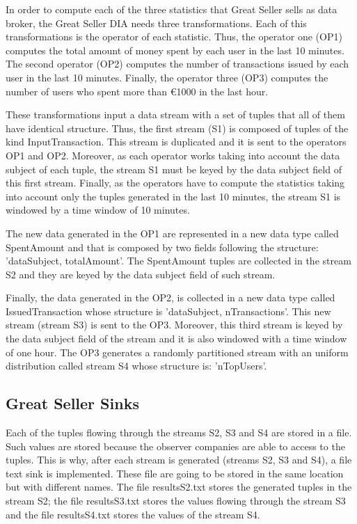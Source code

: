 In order to compute each of the three statistics that Great Seller sells as data broker, the Great Seller DIA needs three transformations. Each of this transformations is the operator of each statistic. Thus, the operator one (OP1) computes the total amount of money spent by each user in the last 10 minutes. The second operator (OP2) computes the number of transactions issued by each user in the last 10 minutes. Finally, the operator three (OP3) computes the number of users who spent more than \euro{1000} in the last hour.

These transformations input a data stream with a set of tuples that all of them have identical structure. Thus, the first stream (S1) is composed of tuples of the kind InputTransaction. This stream is duplicated and it is sent to the operators OP1 and OP2. Moreover, as each operator works taking into account the data subject of each tuple, the stream S1 must be keyed by the data subject field of this first stream. Finally, as the operators have to compute the statistics taking into account only the tuples generated in the last 10 minutes, the stream S1 is windowed by a time window of 10 minutes.

The new data generated in the OP1 are represented in a new data type called SpentAmount and that is composed by two fields following the structure: 'dataSubject, totalAmount'. The SpentAmount tuples are collected in the stream S2 and they are keyed by the data subject field of such stream.

Finally, the data generated in the OP2, is collected in a new data type called IssuedTransaction whose structure is 'dataSubject, nTransactions'. This new stream (stream S3) is sent to the OP3. Moreover, this third stream is keyed by the data subject field of the stream and it is also windowed with a time window of one hour. The OP3 generates a randomly partitioned stream with an uniform distribution called stream S4 whose structure is: 'nTopUsers'.

\subsection{Great Seller Sinks}

Each of the tuples flowing through the streams S2, S3 and S4 are stored in a file. Such values are stored because the observer companies are able to access to the tuples. This is why, after each stream is generated (streams S2, S3 and S4), a file text sink is implemented. These file are going to be stored in the same location but with different names. The file resultsS2.txt stores the generated tuples in the stream S2; the file resultsS3.txt stores the values flowing through the stream S3 and the file resultsS4.txt stores the values of the stream S4.

